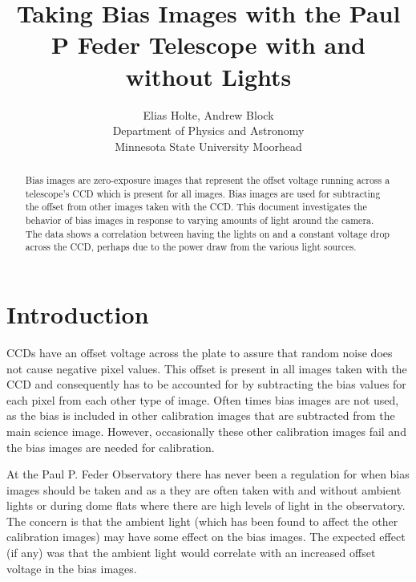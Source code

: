 \documentclass{article}
\begin{document}

\title{Taking Bias Images with the Paul P Feder Telescope with and without Lights}

\author{Elias Holte, Andrew Block\\
	Department of Physics and Astronomy\\
	Minnesota State University Moorhead}

\maketitle

\begin{abstract}
Bias images are zero-exposure images that represent the offset voltage running across a telescope's CCD which is present for all images. Bias images are used for subtracting the offset from other images taken with the CCD. This document investigates the behavior of bias images in response to varying amounts of light around the camera. The data shows a correlation between having the lights on and a constant voltage drop across the CCD, perhaps due to the power draw from the various light sources.
\end{abstract}

\section{Introduction}
CCDs have an offset voltage across the plate to assure that random noise does not cause negative pixel values. This offset is present in all images taken with the CCD and consequently has to be accounted for by subtracting the bias values for each pixel from each other type of image\cite{howell06}. Often times bias images are not used, as the bias is included in other calibration images that are subtracted from the main science image. However, occasionally these other calibration images fail and the bias images are needed for calibration. 

At the Paul P. Feder Observatory there has never been a regulation for when bias images should be taken and as a they are often taken with and without ambient lights or during dome flats where there are high levels of light in the observatory. The concern is that the ambient light (which has been found to affect the other calibration images) may have some effect on the bias images. The expected effect (if any) was that the ambient light would correlate with an increased offset voltage in the bias images.
\end{document}
